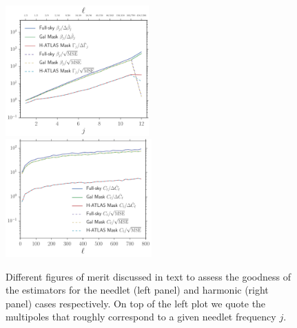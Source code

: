 \begin{figure}[tbp]
\centering %
  \includegraphics[width=0.49\textwidth]{Chapter5/Images/metric_betaj.pdf}
  \includegraphics[width=0.5\textwidth]{Chapter5/Images/metric_cl.pdf}
\caption{\label{fig:metric} Different figures of merit discussed in text to assess the goodness of the estimators for the needlet (left panel) and harmonic (right panel) cases respectively. On top of the left plot
we quote the multipoles that roughly correspond to a given needlet frequency $j$.}
\end{figure}
%

